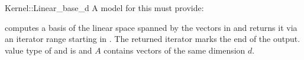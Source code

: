 \begin{ccRefFunctionObjectConcept}{Kernel::Linear_base_d}
A model for this must provide:

{computes a basis of the linear space spanned by the vectors 
in \ccc{A = tuple [first,last)} and returns it via an iterator 
range starting in . The returned iterator marks the 
end of the output.
\ccPrecond value type of  and  
is  and $A$ contains vectors of the same dimension 
$d$.}

\end{ccRefFunctionObjectConcept}
